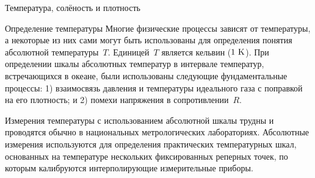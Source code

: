 \begin{chapter}{Температура, солёность и плотность}
\begin{section}{Определение температуры}\label{sec:6.2}
Многие физические процессы зависят от температуры, а некоторые из них
сами могут быть использованы для определения понятия абсолютной 
температуры~$T$. Единицей~$T$ является кельвин ($1\mbox{~K}$). При
определении шкалы абсолютных температур в интервале температур,
встречающихся в океане, были использованы следующие фундаментальные
процессы: 1) взаимосвязь давления и температуры идеального газа
с поправкой на его плотность; и 2) помехи напряжения в сопротивлении~$R$.
%


Измерения температуры с использованием абсолютной шкалы трудны и
проводятся обычно в национальных метрологических
лабораториях. Абсолютные измерения используются для определения
практических температурных шкал, основанных на температуре нескольких
фиксированных реперных точек, по которым калибруются интерполирующие 
измерительные приборы. 
%


\end{section}
\end{chapter}
